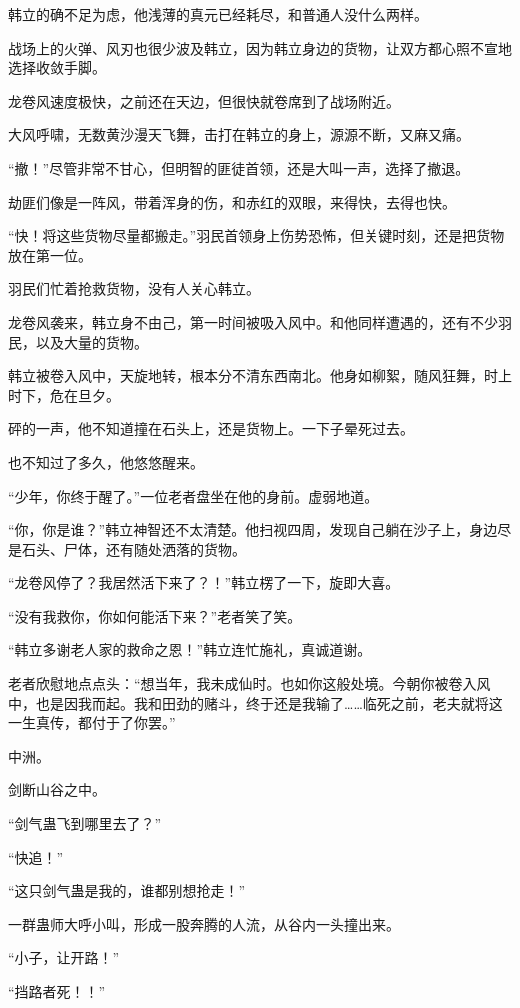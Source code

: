 \begin{this_body}
韩立的确不足为虑，他浅薄的真元已经耗尽，和普通人没什么两样。

战场上的火弹、风刃也很少波及韩立，因为韩立身边的货物，让双方都心照不宣地选择收敛手脚。

龙卷风速度极快，之前还在天边，但很快就卷席到了战场附近。

大风呼啸，无数黄沙漫天飞舞，击打在韩立的身上，源源不断，又麻又痛。

“撤！”尽管非常不甘心，但明智的匪徒首领，还是大叫一声，选择了撤退。

劫匪们像是一阵风，带着浑身的伤，和赤红的双眼，来得快，去得也快。

“快！将这些货物尽量都搬走。”羽民首领身上伤势恐怖，但关键时刻，还是把货物放在第一位。

羽民们忙着抢救货物，没有人关心韩立。

龙卷风袭来，韩立身不由己，第一时间被吸入风中。和他同样遭遇的，还有不少羽民，以及大量的货物。

韩立被卷入风中，天旋地转，根本分不清东西南北。他身如柳絮，随风狂舞，时上时下，危在旦夕。

砰的一声，他不知道撞在石头上，还是货物上。一下子晕死过去。

也不知过了多久，他悠悠醒来。

“少年，你终于醒了。”一位老者盘坐在他的身前。虚弱地道。

“你，你是谁？”韩立神智还不太清楚。他扫视四周，发现自己躺在沙子上，身边尽是石头、尸体，还有随处洒落的货物。

“龙卷风停了？我居然活下来了？！”韩立楞了一下，旋即大喜。

“没有我救你，你如何能活下来？”老者笑了笑。

“韩立多谢老人家的救命之恩！”韩立连忙施礼，真诚道谢。

老者欣慰地点点头：“想当年，我未成仙时。也如你这般处境。今朝你被卷入风中，也是因我而起。我和田劲的赌斗，终于还是我输了……临死之前，老夫就将这一生真传，都付于了你罢。”

中洲。

剑断山谷之中。

“剑气蛊飞到哪里去了？”

“快追！”

“这只剑气蛊是我的，谁都别想抢走！”

一群蛊师大呼小叫，形成一股奔腾的人流，从谷内一头撞出来。

“小子，让开路！”

“挡路者死！！”


\end{this_body}
